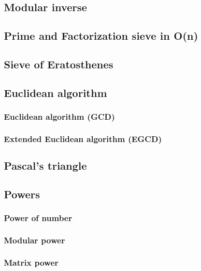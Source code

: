 \documentclass[a4paper]{article}
\begin{document}
    \subsection{Modular inverse}
        
    \subsection{Prime and Factorization sieve in O(n)}
        
    \subsection{Sieve of Eratosthenes}
        
    \subsection{Euclidean algorithm}
        \subsubsection{Euclidean algorithm (GCD)}
            
        \subsubsection{Extended Euclidean algorithm (EGCD)}
            
    \subsection{Pascal's triangle}
        
    \subsection{Powers}
        \subsubsection{Power of number}
            
        \subsubsection{Modular power}
            
        \subsubsection{Matrix power}
            
\end{document}
